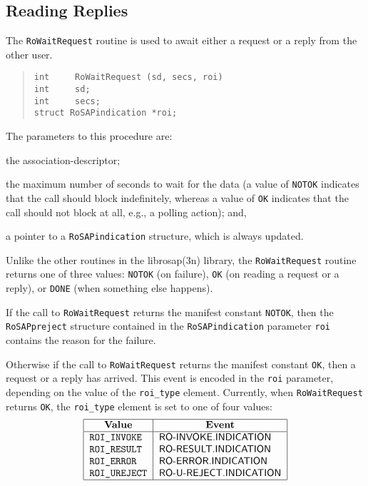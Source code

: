 \subsection     {Reading Replies}\label{replies}
The \verb"RoWaitRequest" routine is used to await either a request or a
reply from the other user.
\begin{quote}\small\begin{verbatim}
int     RoWaitRequest (sd, secs, roi)
int     sd;
int     secs;
struct RoSAPindication *roi;
\end{verbatim}\end{quote}
The parameters to this procedure are:
\begin{describe}
\item[\verb"sd":] the association-descriptor;

\item[\verb"secs":] the maximum number of seconds to wait for the data
(a value of \verb"NOTOK" indicates that the call should block indefinitely,
whereas a value of \verb"OK" indicates that the call should not block at all,
e.g., a polling action);
and,

\item[\verb"roi":] a pointer to a \verb"RoSAPindication" structure,
which is always updated.
\end{describe}
Unlike the other routines in the \man librosap(3n) library,
the \verb"RoWaitRequest" routine returns one of three values:
\verb"NOTOK" (on failure),
\verb"OK" (on reading a request or a reply),
or
\verb"DONE" (when something else happens).

If the call to \verb"RoWaitRequest" returns the manifest constant
\verb"NOTOK",
then the \verb"RoSAPpreject" structure contained in
the \verb"RoSAPindication" parameter
\verb"roi" contains the reason for the failure.

Otherwise if the call to \verb"RoWaitRequest" returns the manifest constant
\verb"OK",
then a request or a reply has arrived.
This event is encoded in the \verb"roi" parameter,
depending on the value of the \verb"roi_type" element.
Currently,
when \verb"RoWaitRequest" returns \verb"OK",
the \verb"roi_type" element is set to one of four values:
\[\begin{tabular}{|l|l|}
\hline
    \multicolumn{1}{|c|}{\bf Value}&
			\multicolumn{1}{c|}{\bf Event}\\
\hline
    \tt ROI\_INVOKE&	\sf RO-INVOKE.INDICATION\\
    \tt ROI\_RESULT&	\sf RO-RESULT.INDICATION\\
    \tt ROI\_ERROR&	\sf RO-ERROR.INDICATION\\
    \tt ROI\_UREJECT&	\sf RO-U-REJECT.INDICATION\\
\hline
\end{tabular}\]

